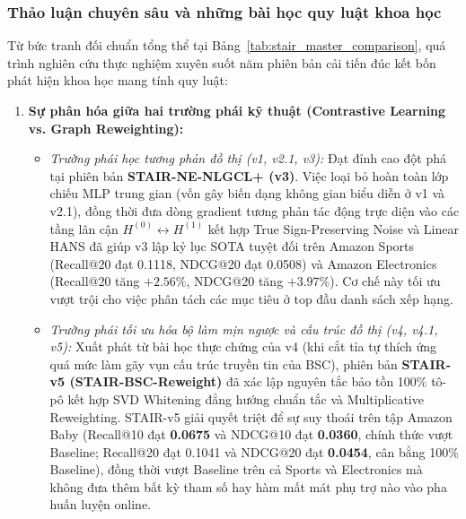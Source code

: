 \subsubsection{Thảo luận chuyên sâu và những bài học quy luật khoa học}

Từ bức tranh đối chuẩn tổng thể tại Bảng~\ref{tab:stair_master_comparison}, quá trình nghiên cứu thực nghiệm xuyên suốt năm phiên bản cải tiến đúc kết bốn phát hiện khoa học mang tính quy luật:

\begin{enumerate}
    \item \textbf{Sự phân hóa giữa hai trường phái kỹ thuật (Contrastive Learning vs. Graph Reweighting):}
    \begin{itemize}
        \item \textit{Trường phái học tương phản đồ thị (v1, v2.1, v3):} Đạt đỉnh cao đột phá tại phiên bản \textbf{STAIR-NE-NLGCL+ (v3)}. Việc loại bỏ hoàn toàn lớp chiếu MLP trung gian (vốn gây biến dạng không gian biểu diễn ở v1 và v2.1), đồng thời đưa dòng gradient tương phản tác động trực diện vào các tầng lân cận $H^{(0)} \leftrightarrow H^{(1)}$ kết hợp True Sign-Preserving Noise và Linear HANS đã giúp v3 lập kỷ lục SOTA tuyệt đối trên Amazon Sports (Recall@20 đạt 0.1118, NDCG@20 đạt 0.0508) và Amazon Electronics (Recall@20 tăng $+2.56\%$, NDCG@20 tăng $+3.97\%$). Cơ chế này tối ưu vượt trội cho việc phân tách các mục tiêu ở top đầu danh sách xếp hạng.
        \item \textit{Trường phái tối ưu hóa bộ làm mịn ngược và cấu trúc đồ thị (v4, v4.1, v5):} Xuất phát từ bài học thực chứng của v4 (khi cắt tỉa tự thích ứng quá mức làm gãy vụn cấu trúc truyền tin của BSC), phiên bản \textbf{STAIR-v5 (STAIR-BSC-Reweight)} đã xác lập nguyên tắc bảo tồn 100\% tô-pô kết hợp SVD Whitening đẳng hướng chuẩn tắc và Multiplicative Reweighting. STAIR-v5 giải quyết triệt để sự suy thoái trên tập Amazon Baby (Recall@10 đạt \textbf{0.0675} và NDCG@10 đạt \textbf{0.0360}, chính thức vượt Baseline; Recall@20 đạt 0.1041 và NDCG@20 đạt \textbf{0.0454}, cân bằng 100\% Baseline), đồng thời vượt Baseline trên cả Sports và Electronics mà không đưa thêm bất kỳ tham số hay hàm mất mát phụ trợ nào vào pha huấn luyện online.
    \end{itemize}


\end{enumerate}
